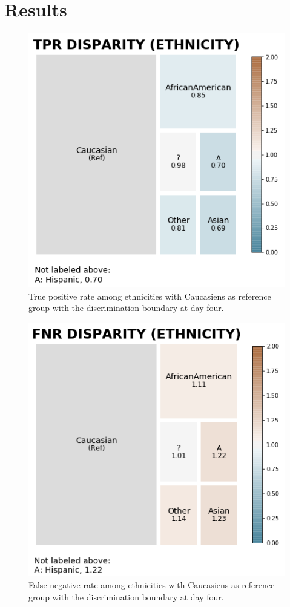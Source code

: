 \documentclass[journal]{IEEEtran}
\begin{document}
%
%
\section{Results} 
\begin{figure}
	\centering
	\includegraphics[width=0.8\linewidth]{../imgs/tpr_paper}
	\caption{True positive rate among ethnicities with Caucasiens as reference group with the discrimination boundary at day four.}
	\label{fig:tpr}
\end{figure}

\begin{figure}
	\centering
	\includegraphics[width=0.8\linewidth]{../imgs/fnr_paper}
	\caption{False negative rate among ethnicities with Caucasiens as reference group with the discrimination boundary at day four.}
	\label{fig:fpr}
\end{figure}
\end{document}
